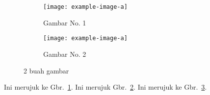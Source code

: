 \documentclass{article}
\begin{document}
\begin{figure}[!ht]
	\centering
        \begin{subfigure}[t]{.4\linewidth}
        	\centering
                \texttt{[image: example-image-a]}
                \caption{Gambar No. 1}\label{fig:a}
        \end{subfigure}
        \begin{subfigure}[t]{.4\linewidth}
        	\centering
                \texttt{[image: example-image-a]}
                \caption{Gambar No. 2}\label{fig:b}
	\end{subfigure}
\caption{2 buah gambar}\label{fig:contoh}
\end{figure}


Ini merujuk ke Gbr.~\ref{fig:a}. Ini merujuk Gbr.~\ref{fig:b}. Ini merujuk ke
Gbr.~\ref{fig:contoh}.
\end{document}
